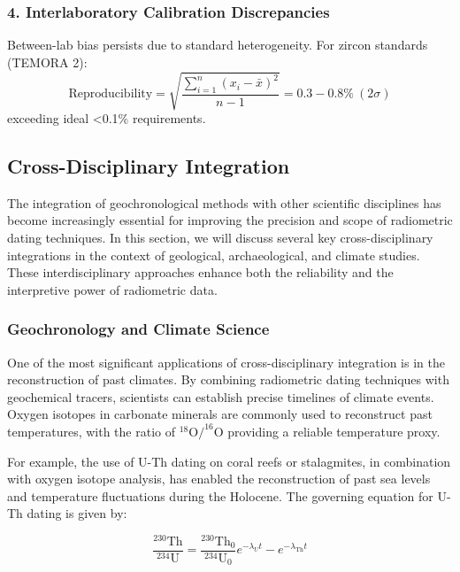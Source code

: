 \documentclass{article}
\begin{document}
\subsubsection*{4. Interlaboratory Calibration Discrepancies}
Between-lab bias persists due to standard heterogeneity. For zircon standards (TEMORA 2):
\begin{equation}
    \text{Reproducibility} = \sqrt{\frac{\sum_{i=1}^n (x_i - \bar{x})^2}{n-1}} = 0.3-0.8\%\ (2\sigma)
    \label{eq:reproducibility}
\end{equation}
exceeding ideal <0.1\% requirements.

\subsection{Cross-Disciplinary Integration}

The integration of geochronological methods with other scientific disciplines has become increasingly essential for improving the precision and scope of radiometric dating techniques. In this section, we will discuss several key cross-disciplinary integrations in the context of geological, archaeological, and climate studies. These interdisciplinary approaches enhance both the reliability and the interpretive power of radiometric data.

\subsubsection*{Geochronology and Climate Science}

One of the most significant applications of cross-disciplinary integration is in the reconstruction of past climates. By combining radiometric dating techniques with geochemical tracers, scientists can establish precise timelines of climate events. Oxygen isotopes in carbonate minerals are commonly used to reconstruct past temperatures, with the ratio of \(^{18}\text{O}/^{16}\text{O}\) providing a reliable temperature proxy.

For example, the use of U-Th dating on coral reefs or stalagmites, in combination with oxygen isotope analysis, has enabled the reconstruction of past sea levels and temperature fluctuations during the Holocene. The governing equation for U-Th dating is given by:

\begin{equation}
\frac{^{230}\text{Th}}{^{234}\text{U}} = \frac{^{230}\text{Th}_0}{^{234}\text{U}_0} e^{-\lambda_U t} - e^{-\lambda_{\text{Th}} t}
\end{equation}
\end{document}

